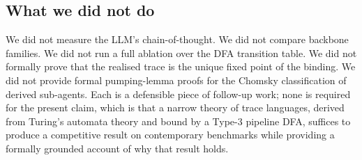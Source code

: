 \subsection{What we did not do}

We did not measure the LLM's chain-of-thought.  We did not
compare backbone families.  We did not run a full ablation over
the DFA transition table.  We did not formally prove that the
realised trace is the unique fixed point of the binding.  We
did not provide formal pumping-lemma proofs for the Chomsky
classification of derived sub-agents.  Each is a defensible
piece of follow-up work; none is required for the present claim,
which is that a narrow theory of trace languages, derived from
Turing's automata theory and bound by a Type-3 pipeline DFA,
suffices to produce a competitive result on contemporary
benchmarks while providing a formally grounded account of
why that result holds.
